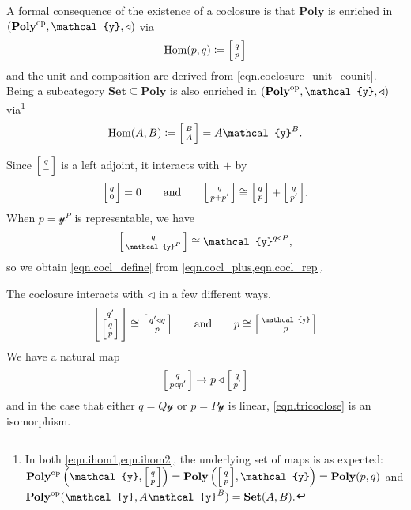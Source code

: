 \documentclass[11pt, one side, article]{memoir}
\makeatletter
\theoremstyle{definition}
\theoremstyle{plain}
\renewcommand{\ss}{\subseteq}
\DeclareMathOperator{\Hom}{Hom}
\newcommand{\iHom}{\ul{\Hom}}
\newcommand{\Cat}[1]{\mathbf{#1}}%
\newcommand{\op}{^\tn{op}}
\newcommand{\tn}[1]{\textnormal{#1}}
\newcommand{\ul}[1]{\underline{#1}}
\newcommand{\smset}{\Cat{Set}}
\newcommand{\yon}{{\mathcal{y}}}
\newcommand{\poly}{\Cat{Poly}}
\newcommand{\0}{\textsf{0}}
\newcommand{\1}{\tn{\textsf{1}}}
\newcommand{\tri}{\mathbin{\triangleleft}}
\newcommand{\biglens}[2]{
     \begin{bmatrix}{\vphantom{f_f^f}#2} \\ {\vphantom{f_f^f}#1} \end{bmatrix}
}
\newcommand{\littlelens}[2]{
     \begin{bsmallmatrix}{\vphantom{f}#2} \\ {\vphantom{f}#1} \end{bsmallmatrix}
}
\newcommand{\lens}[2]{
  \relax\if@display
     \biglens{#1}{#2}
  \else
     \littlelens{#1}{#2}
  \fi
}
\newcommand{\hh}[2][]{#1 \tn{#2} #1}
\newcommand{\qqand}{\hh[\qquad]{and}}
\makeatother
\begin{document}
A formal consequence of the existence of a coclosure is that $\poly$ is enriched in $(\poly\op,\yon,\tri)$ via
\begin{equation}\label{eqn.ihom1}
	\iHom(p,q)\coloneqq\lens{p}{q}
\end{equation}
and the unit and composition are derived from \eqref{eqn.coclosure_unit_counit}. Being a subcategory $\smset\ss\poly$ is also enriched in $(\poly\op,\yon,\tri)$ via\footnote{
In both \cref{eqn.ihom1,eqn.ihom2}, the underlying set of maps is as expected:
$
\poly\op\left(\yon,\lens{p}{q}\right)=\poly\left(\lens{p}{q},\yon\right)=\poly(p,q)
$ and
$
\poly\op(\yon,A\yon^B)=\smset(A,B).
$
}
\begin{equation}\label{eqn.ihom2}
	\iHom(A,B)\coloneqq\lens{A}{B}=A\yon^B.
\end{equation}



Since $\lens{-}{q}$ is a left adjoint, it interacts with $+$ by
\begin{equation}\label{eqn.cocl_plus}
	\lens{0}{q}=0
	\qqand
	\lens{p+p'}{q}\cong\lens{p}{q}+\lens{p'}{q}.
\end{equation}
When $p=\yon^P$ is representable, we have
\begin{equation}\label{eqn.cocl_rep}
	\lens{\yon^P}{q}\cong\yon^{q\tri P},
\end{equation}
so we obtain \eqref{eqn.cocl_define} from \cref{eqn.cocl_plus,eqn.cocl_rep}. 

The coclosure interacts with $\tri$ in a few different ways.
\begin{equation}
	\lens{\lens{p}{q}}{q'}\cong\lens{p}{q'\tri q}
	\qqand
	p\cong\lens{p}{\yon}
\end{equation}
We have a natural map
\begin{equation}\label{eqn.tricoclose}
	\lens{p\tri p'}{q}\to p\tri\lens{p'}{q}
\end{equation}
and in the case that either $q=Q\yon$ or $p=P\yon$ is linear, \eqref{eqn.tricoclose} is an isomorphism.
\end{document}
